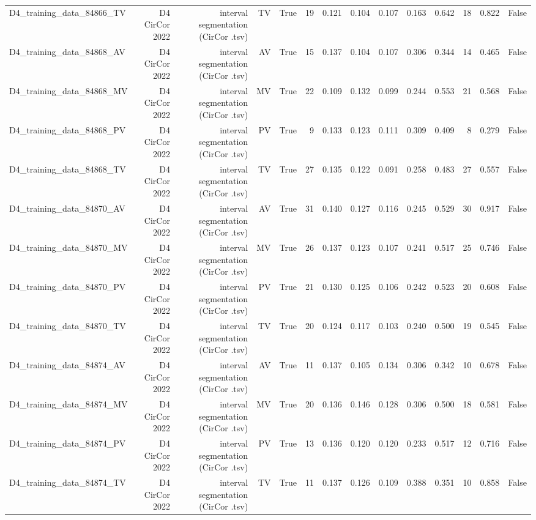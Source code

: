 \begin{table}[htbp]
\begin{tabular}{lrrrrrrrrrrrrr}
    D4\_training\_data\_84866\_TV & D4 CirCor 2022 & interval segmentation (CirCor .tsv) & TV & True & 19 & 0.121 & 0.104 & 0.107 & 0.163 & 0.642 & 18 & 0.822 & False \\
    D4\_training\_data\_84868\_AV & D4 CirCor 2022 & interval segmentation (CirCor .tsv) & AV & True & 15 & 0.137 & 0.104 & 0.107 & 0.306 & 0.344 & 14 & 0.465 & False \\
    D4\_training\_data\_84868\_MV & D4 CirCor 2022 & interval segmentation (CirCor .tsv) & MV & True & 22 & 0.109 & 0.132 & 0.099 & 0.244 & 0.553 & 21 & 0.568 & False \\
    D4\_training\_data\_84868\_PV & D4 CirCor 2022 & interval segmentation (CirCor .tsv) & PV & True & 9 & 0.133 & 0.123 & 0.111 & 0.309 & 0.409 & 8 & 0.279 & False \\
    D4\_training\_data\_84868\_TV & D4 CirCor 2022 & interval segmentation (CirCor .tsv) & TV & True & 27 & 0.135 & 0.122 & 0.091 & 0.258 & 0.483 & 27 & 0.557 & False \\
    D4\_training\_data\_84870\_AV & D4 CirCor 2022 & interval segmentation (CirCor .tsv) & AV & True & 31 & 0.140 & 0.127 & 0.116 & 0.245 & 0.529 & 30 & 0.917 & False \\
    D4\_training\_data\_84870\_MV & D4 CirCor 2022 & interval segmentation (CirCor .tsv) & MV & True & 26 & 0.137 & 0.123 & 0.107 & 0.241 & 0.517 & 25 & 0.746 & False \\
    D4\_training\_data\_84870\_PV & D4 CirCor 2022 & interval segmentation (CirCor .tsv) & PV & True & 21 & 0.130 & 0.125 & 0.106 & 0.242 & 0.523 & 20 & 0.608 & False \\
    D4\_training\_data\_84870\_TV & D4 CirCor 2022 & interval segmentation (CirCor .tsv) & TV & True & 20 & 0.124 & 0.117 & 0.103 & 0.240 & 0.500 & 19 & 0.545 & False \\
    D4\_training\_data\_84874\_AV & D4 CirCor 2022 & interval segmentation (CirCor .tsv) & AV & True & 11 & 0.137 & 0.105 & 0.134 & 0.306 & 0.342 & 10 & 0.678 & False \\
    D4\_training\_data\_84874\_MV & D4 CirCor 2022 & interval segmentation (CirCor .tsv) & MV & True & 20 & 0.136 & 0.146 & 0.128 & 0.306 & 0.500 & 18 & 0.581 & False \\
    D4\_training\_data\_84874\_PV & D4 CirCor 2022 & interval segmentation (CirCor .tsv) & PV & True & 13 & 0.136 & 0.120 & 0.120 & 0.233 & 0.517 & 12 & 0.716 & False \\
    D4\_training\_data\_84874\_TV & D4 CirCor 2022 & interval segmentation (CirCor .tsv) & TV & True & 11 & 0.137 & 0.126 & 0.109 & 0.388 & 0.351 & 10 & 0.858 & False \\

\end{tabular}
\end{table}
